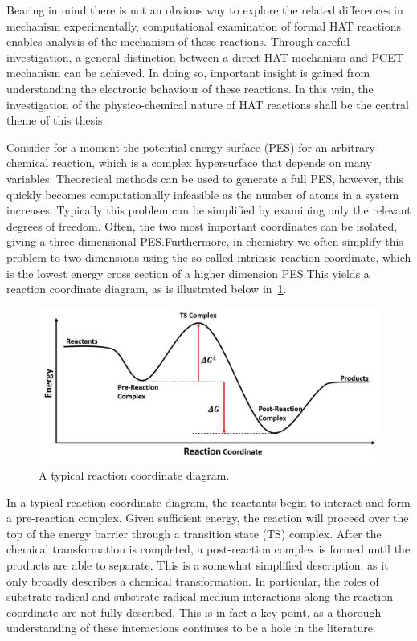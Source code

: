 Bearing in mind there is not an obvious way to explore the related differences in mechanism experimentally, computational examination of formal HAT reactions enables analysis of the mechanism of these reactions. Through careful investigation, a general distinction between a direct HAT mechanism and PCET mechanism can be achieved. In doing so, important insight is gained from understanding the electronic behaviour of these reactions. In this vein, the investigation of the physico-chemical nature of HAT reactions shall be the central theme of this thesis.

Consider for a moment the potential energy surface (PES) for an arbitrary chemical reaction, which is a complex hypersurface that depends on many variables. Theoretical methods can be used to generate a full PES, however, this quickly becomes computationally infeasible as the number of atoms in a system increases. Typically this problem can be simplified by examining only the relevant degrees of freedom. Often, the two most important coordinates can be isolated, giving a three-dimensional PES.\@ Furthermore, in chemistry we often simplify this problem to two-dimensions using the so-called intrinsic reaction coordinate, which is the lowest energy cross section of a higher dimension PES.\@ This yields a reaction coordinate diagram, as is illustrated below in~\ref{fig:pes}.

\begin{figure}[htb]
  \centering
  \includegraphics[width=\textwidth]{figures/pes}
  \caption[A typical reaction coordinate diagram.]{A typical reaction coordinate diagram.}
\label{fig:pes}
\end{figure}

In a typical reaction coordinate diagram, the reactants begin to interact and form a pre-reaction complex. Given sufficient energy, the reaction will proceed over the top of the energy barrier through a transition state (TS) complex. After the chemical transformation is completed, a post-reaction complex is formed until the products are able to separate. This is a somewhat simplified description, as it only broadly describes a chemical transformation. In particular, the roles of substrate-radical and substrate-radical-medium interactions along the reaction coordinate are not fully described. This is in fact a key point, as a thorough understanding of these interactions continues to be a hole in the literature.

